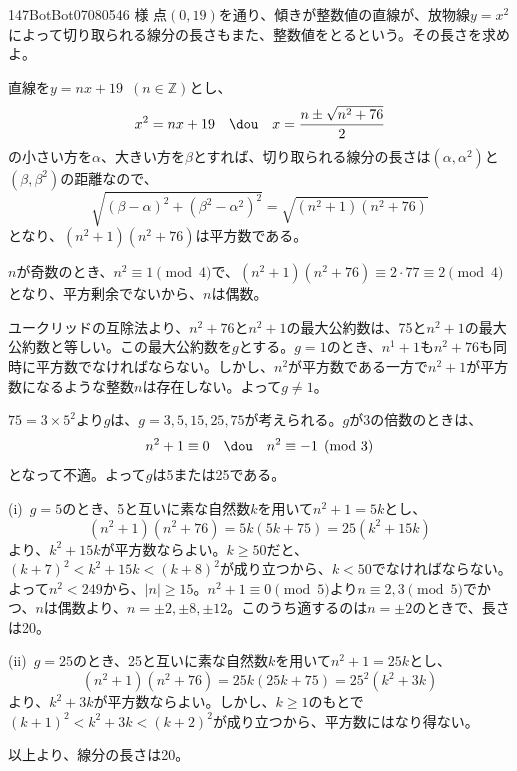 \begin{prob}{147}{}{BotBot07080546 様}
 点$(0,19)$を通り、傾きが整数値の直線が、放物線$y=x^2$によって切り取られる線分の長さもまた、整数値をとるという。その長さを求めよ。
\end{prob}

直線を$y=nx+19$~$(n\in\mathbb{Z})$とし、
\[ x^2=nx+19 \quad\dou\quad x=\frac{n\pm\sqrt{n^2+76}}{2} \]
の小さい方を$\alpha$、大きい方を$\beta$とすれば、切り取られる線分の長さは$(\alpha, \alpha^2)$と$(\beta, \beta^2)$の距離なので、
\[ \sqrt{(\beta-\alpha)^2+(\beta^2-\alpha^2)^2} = \sqrt{(n^2+1)(n^2+76)} \]
となり、$(n^2+1)(n^2+76)$は平方数である。

$n$が奇数のとき、$n^2\equiv 1 \pmod{4}$で、$(n^2+1)(n^2+76)\equiv 2\cdot 77 \equiv 2 \pmod{4}$となり、平方剰余でないから、$n$は偶数。

ユークリッドの互除法より、$n^2+76$と$n^2+1$の最大公約数は、75と$n^2+1$の最大公約数と等しい。この最大公約数を$g$とする。$g=1$のとき、$n^1+1$も$n^2+76$も同時に平方数でなければならない。しかし、$n^2$が平方数である一方で$n^2+1$が平方数になるような整数$n$は存在しない。よって$g\neq 1$。

$75=3\times 5^2$より$g$は、$g=3, 5, 15, 25, 75$が考えられる。$g$が3の倍数のときは、
\[ n^2+1\equiv 0 \quad\dou\quad n^2\equiv -1 \pmod{3} \]
となって不適。よって$g$は5または25である。

(i)~$g=5$のとき、5と互いに素な自然数$k$を用いて$n^2+1=5k$とし、
\[ (n^2+1)(n^2+76)=5k(5k+75)=25(k^2+15k) \]
より、$k^2+15k$が平方数ならよい。$k\ge 50$だと、$(k+7)^2<k^2+15k<(k+8)^2$が成り立つから、$k<50$でなければならない。よって$n^2<249$から、$|n|\ge 15$。$n^2+1\equiv 0 \pmod{5}$より$n\equiv 2, 3 \pmod{5}$でかつ、$n$は偶数より、$n=\pm2, \pm8, \pm12$。このうち適するのは$n=\pm 2$のときで、長さは20。

(ii)~$g=25$のとき、25と互いに素な自然数$k$を用いて$n^2+1=25k$とし、
\[ (n^2+1)(n^2+76)=25k(25k+75)=25^2(k^2+3k) \]
より、$k^2+3k$が平方数ならよい。しかし、$k\ge 1$のもとで$(k+1)^2<k^2+3k<(k+2)^2$が成り立つから、平方数にはなり得ない。

以上より、線分の長さは20。